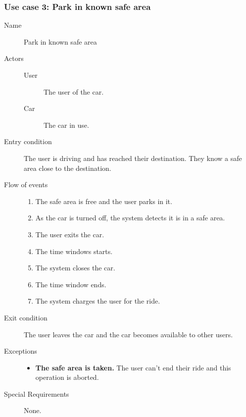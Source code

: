 	\subsubsection{Use case 3: Park in known safe area}
		\begin{description}
			\item[Name] Park in known safe area
			\item[Actors] \hfill
				\begin{description}
					\item[User] The user of the car.
					\item[Car] The car in use.
				\end{description}
			\item[Entry condition] The user is driving and has reached their destination. They know a safe area close to the destination.
			\item[Flow of events] \hfill
				\begin{enumerate}
					\item The safe area is free and the user parks in it.
					\item As the car is turned off, the system detects it is in a safe area.
					\item The user exits the car.
					\item The time windows starts.
					\item The system closes the car.
					\item The time window ends.
					\item The system charges the user for the ride.
				\end{enumerate}
			\item[Exit condition] The user leaves the car and the car becomes available to other users.
			\item[Exceptions] \hfill
				\begin{itemize}
					\item \textbf{The safe area is taken.} The user can't end their ride and this operation is aborted.
				\end{itemize}
			\item[Special Requirements] None. %
		\end{description}

